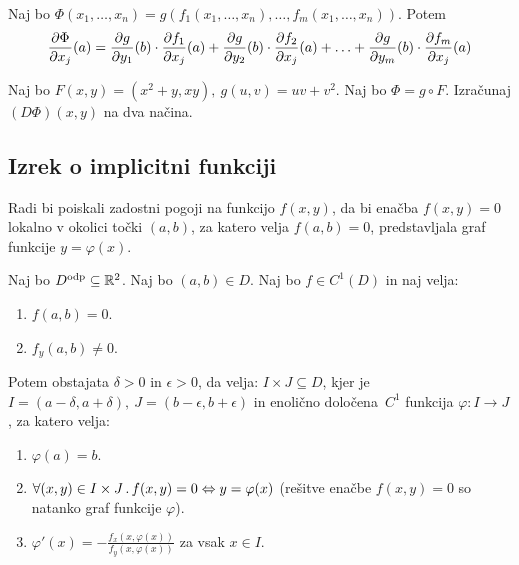 \begin{posledica}[$k=1$, $G = g$ funkcija]
    Naj bo $\Phi(x_1, \ldots, x_n) = g(f_1(x_1, \ldots, x_n), \ldots, f_m(x_1, \ldots, x_n))$. Potem 
    $$\frac{\partial \Phi}{\partial x_j}(a) = \frac{\partial g}{\partial y_1}(b) \cdot \frac{\partial f_1}{\partial x_j}(a) + \frac{\partial g}{\partial y_2}(b) \cdot \frac{\partial f_2}{\partial x_j}(a) + \ldots + \frac{\partial g}{\partial y_m}(b) \cdot \frac{\partial f_m}{\partial x_j}(a)$$
\end{posledica}

\begin{zgled}
    Naj bo $F(x,y) = (x^2 + y, xy), \ g(u, v) = uv + v^2$. Naj bo $\Phi = g \circ F$. Izračunaj $(D\Phi)(x,y)$ na dva načina.
\end{zgled}

\subsection{Izrek o implicitni funkciji}
Radi bi poiskali zadostni pogoji na funkcijo $f(x, y)$, da bi enačba $f(x, y) = 0$ lokalno v okolici točki $(a,b)$, za katero velja $f(a,b) = 0$, predstavljala graf funkcije $y = \varphi(x)$.

\begin{izrek}
    Naj bo $D^{\text{odp}} \subseteq \mathbb{R}^2$. Naj bo $(a, b) \in D$. Naj bo $f \in C^1(D)$ in naj velja:
    \begin{enumerate}
        \item $f(a,b) = 0$.
        \item $f_y(a,b) \neq 0$.
    \end{enumerate}
    Potem obstajata $\delta > 0$ in $\epsilon > 0$, da velja: $I \times J \subseteq D$, kjer je $I = (a - \delta, a + \delta), \ J = (b-\epsilon, b+\epsilon)$ in enolično določena~$C^1$ funkcija $\varphi: I \to J$, za katero velja:
    \begin{enumerate}
        \item $\varphi(a) = b$.
        \item $\forall (x,y) \in I \times J \,.\, f(x, y) = 0 \Leftrightarrow y = \varphi (x)$ (rešitve enačbe $f(x,y) = 0$ so natanko graf funkcije $\varphi$).
        \item $\varphi'(x) = -\frac{f_x(x, \varphi(x))}{f_y(x, \varphi(x))}$ za vsak $x \in I$.
    \end{enumerate}
\end{izrek}